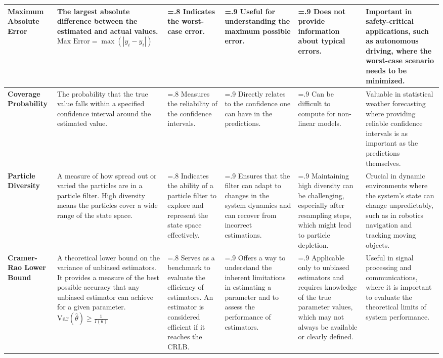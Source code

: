 \begin{landscape}
\begin{table}
\begin{tabularx}{\linewidth}{@{} l 
>{\hsize=1.2\hsize}X  
>{\hsize=.8\hsize}X  
>{\hsize=.9\hsize}X  
>{\hsize=.9\hsize}X 
>{\hsize=1.2\hsize}X 
@{}}
\midrule
\textbf{Maximum Absolute Error} & The largest absolute difference between the estimated and actual values. \newline
\( \text{Max Error} = \max(|y_i - \hat{y}_i|) \) & Indicates the worst-case error. & Useful for understanding the maximum possible error. & Does not provide information about typical errors. & Important in safety-critical applications, such as autonomous driving, where the worst-case scenario needs to be minimized. \\ 
\midrule
\textbf{Coverage Probability} & The probability that the true value falls within a specified confidence interval around the estimated value. & Measures the reliability of the confidence intervals. & Directly relates to the confidence one can have in the predictions. & Can be difficult to compute for non-linear models. & Valuable in statistical weather forecasting where providing reliable confidence intervals is as important as the predictions themselves. \\ 
\midrule
\textbf{Particle Diversity} & A measure of how spread out or varied the particles are in a particle filter. High diversity means the particles cover a wide range of the state space. & Indicates the ability of a particle filter to explore and represent the state space effectively. & Ensures that the filter can adapt to changes in the system dynamics and can recover from incorrect estimations. & Maintaining high diversity can be challenging, especially after resampling steps, which might lead to particle depletion. & Crucial in dynamic environments where the system's state can change unpredictably, such as in robotics navigation and tracking moving objects. \\ 
\midrule
\textbf{Cramer-Rao Lower Bound} & A theoretical lower bound on the variance of unbiased estimators. It provides a measure of the best possible accuracy that any unbiased estimator can achieve for a given parameter. %
\( \text{Var}(\hat{\theta}) \geq \frac{1}{I(\theta)} \) & Serves as a benchmark to evaluate the efficiency of estimators. An estimator is considered efficient if it reaches the CRLB. & Offers a way to understand the inherent limitations in estimating a parameter and to assess the performance of estimators. & Applicable only to unbiased estimators and requires knowledge of the true parameter values, which may not always be available or clearly defined. & Useful in signal processing and communications, where it is important to evaluate the theoretical limits of system performance. \\ 
\bottomrule
\end{tabularx}
\end{table}
\end{landscape}
\restoregeometry






